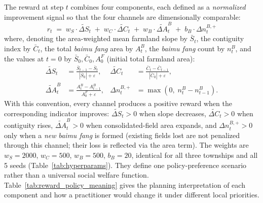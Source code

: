 \documentclass[preprint,12pt]{elsarticle}
\begin{document}
The reward at step $t$ combines four components, each defined as a \textit{normalized} improvement signal so that the four channels are dimensionally comparable:
\begin{equation}
r_t \;=\; w_S \cdot \widetilde{\Delta S}_t \;+\; w_C \cdot \widetilde{\Delta C}_t \;+\; w_B \cdot \widetilde{\Delta A}^{B}_t \;+\; b_B \cdot \Delta n^{B,+}_t
\label{eq:reward}
\end{equation}
where, denoting the area-weighted mean farmland slope by $\bar{S}_t$, the contiguity index by $\bar{C}_t$, the total \textit{baimu fang} area by $A^{B}_t$, the \textit{baimu fang} count by $n^{B}_t$, and the values at $t{=}0$ by $\bar{S}_0,\bar{C}_0,A^{F}_0$ (initial total farmland area):
\begin{align}
\widetilde{\Delta S}_t &= \frac{\bar{S}_{t-1} - \bar{S}_t}{|\bar{S}_0| + \varepsilon}, &
\widetilde{\Delta C}_t &= \frac{\bar{C}_t - \bar{C}_{t-1}}{|\bar{C}_0| + \varepsilon}, \\
\widetilde{\Delta A}^{B}_t &= \frac{A^{B}_t - A^{B}_{t-1}}{A^{F}_0 + \varepsilon}, &
\Delta n^{B,+}_t &= \max\!\left(0,\; n^{B}_t - n^{B}_{t-1}\right).
\end{align}
With this convention, every channel produces a positive reward when the corresponding indicator improves: $\widetilde{\Delta S}_t > 0$ when slope decreases, $\widetilde{\Delta C}_t > 0$ when contiguity rises, $\widetilde{\Delta A}^{B}_t > 0$ when consolidated-field area expands, and $\Delta n^{B,+}_t > 0$ only when a \textit{new} \textit{baimu fang} is formed (existing fields lost are not penalized through this channel; their loss is reflected via the area term). The weights are $w_S = 2000$, $w_C = 500$, $w_B = 500$, $b_B = 20$, identical for all three townships and all 5 seeds (Table~\ref{tab:hyperparams}). They define one policy-preference scenario rather than a universal social welfare function. Table~\ref{tab:reward_policy_meaning} gives the planning interpretation of each component and how a practitioner would change it under different local priorities.
\end{document}
